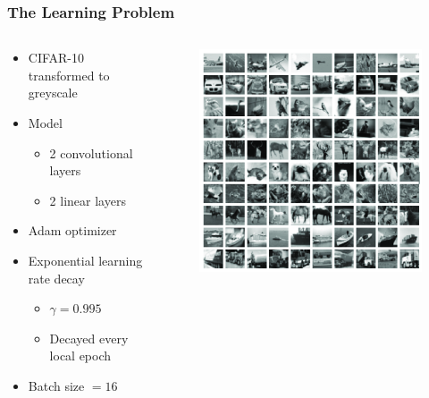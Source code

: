 \documentclass{beamer}
\begin{document}
\begin{frame}
	\frametitle{The Learning Problem}	
	\noindent
	\begin{columns}
		\begin{column}{.5\textwidth}
			\begin{itemize}
				\item CIFAR-10 transformed to greyscale
				\item Model
					\begin{itemize}
						\item 2 convolutional layers
						\item 2 linear layers
					\end{itemize}
				\item Adam optimizer
                                \item Exponential learning rate decay
					\begin{itemize}
						\item $\gamma = 0.995$
						\item Decayed every local epoch
					\end{itemize}
				\item Batch size $= 16$
			\end{itemize}
		\end{column}
		\begin{column}{.5\textwidth} 
			\begin{figure}
				\centering
				\includegraphics[width=\textwidth]{imgs/cifar10-greyscale.png}
			\end{figure}
		\end{column}	
	\end{columns}
\end{frame}
\end{document}
